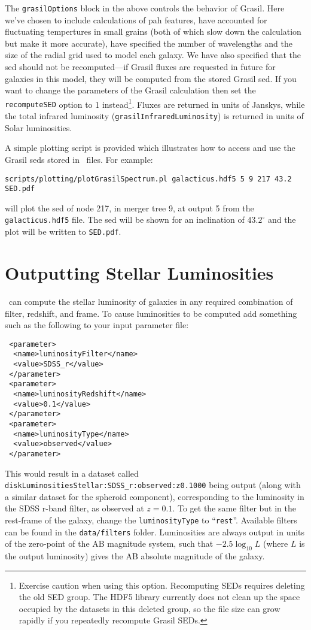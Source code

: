 The {\tt grasilOptions} block in the above controls the behavior of {\sc Grasil}. Here we've chosen to include calculations of \gls{pah} features, have accounted for fluctuating tempertures in small grains (both of which slow down the calculation but make it more accurate), have specified the number of wavelengths and the size of the radial grid used to model each galaxy. We have also specified that the \gls{sed} should not be recomputed---if {\sc Grasil} fluxes are requested in future for galaxies in this model, they will be computed from the stored {\sc Grasil} \gls{sed}. If you want to change the parameters of the {\sc Grasil} calculation then set the {\tt recomputeSED} option to 1 instead\footnote{Exercise caution when using this option. Recomputing SEDs requires deleting the old SED group. The HDF5 library currently does not clean up the space occupied by the datasets in this deleted group, so the file size can grow rapidly if you repeatedly recompute {\sc Grasil} SEDs.}. Fluxes are returned in units of Janskys, while the total infrared luminosity ({\tt grasilInfraredLuminosity}) is returned in units of Solar luminosities.

A simple plotting script is provided which illustrates how to access and use the {\sc Grasil} \glspl{sed} stored in \glc\ files. For example:
\begin{verbatim}
scripts/plotting/plotGrasilSpectrum.pl galacticus.hdf5 5 9 217 43.2 SED.pdf
\end{verbatim}
will plot the \gls{sed} of node 217, in merger tree 9, at output 5 from the {\tt galacticus.hdf5} file. The \gls{sed} will be shown for an inclination of $43.2^\circ$ and the plot will be written to {\tt SED.pdf}.

\section{Outputting Stellar Luminosities}

\glc\ can compute the stellar luminosity of galaxies in any required combination of filter, redshift, and frame. To cause luminosities to be computed add something such as the following to your input parameter file:
\begin{verbatim}
 <parameter>
  <name>luminosityFilter</name>
  <value>SDSS_r</value>
 </parameter>
 <parameter>
  <name>luminosityRedshift</name>
  <value>0.1</value>
 </parameter>
 <parameter>
  <name>luminosityType</name>
  <value>observed</value>
 </parameter>
\end{verbatim}
This would result in a dataset called {\tt diskLuminositiesStellar:SDSS\_r:observed:z0.1000} being output (along with a similar dataset for the spheroid component), corresponding to the luminosity in the SDSS r-band filter, as observed at $z=0.1$. To get the same filter but in the rest-frame of the galaxy, change the {\tt luminosityType} to ``{\tt rest}''. Available filters can be found in the {\tt data/filters} folder. Luminosities are always output in units of the zero-point of the AB magnitude system, such that $-2.5\log_{10}L$ (where $L$ is the output luminosity) gives the AB absolute magnitude of the galaxy.

